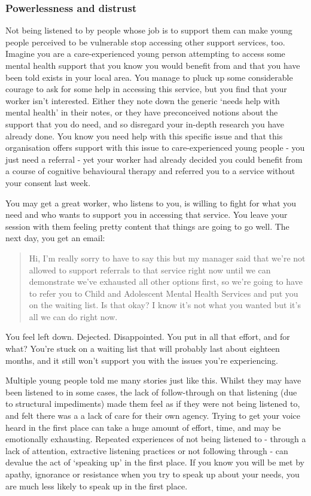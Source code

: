 \subsubsection{Powerlessness and distrust}
Not being listened to by people whose job is to support them can make young people perceived to be vulnerable stop accessing other support services, too. Imagine you are a care-experienced young person attempting to access some mental health support that you know you would benefit from and that you have been told exists in your local area. You manage to pluck up some considerable courage to ask for some help in accessing this service, but you find that your worker isn't interested. Either they note down the generic `needs help with mental health' in their notes, or they have preconceived notions about the support that you do need, and so disregard your in-depth research you have already done. You know you need help with this specific issue and that this organisation offers support with this issue to care-experienced young people - you just need a referral - yet your worker had already decided you could benefit from a course of cognitive behavioural therapy and referred you to a service without your consent last week.

You may get a great worker, who listens to you, is willing to fight for what you need and who wants to support you in accessing that service. You leave your session with them feeling pretty content that things are going to go well. The next day, you get an email:
\begin{quote}
Hi, I'm really sorry to have to say this but my manager said that we’re not allowed to support referrals to that service right now until we can demonstrate we’ve exhausted all other options first, so we’re going to have to refer you to Child and Adolescent Mental Health Services and put you on the waiting list. Is that okay? I know it's not what you wanted but it's all we can do right now.
\end{quote}
You feel left down. Dejected. Disappointed. You put in all that effort, and for what? You’re stuck on a waiting list that will probably last about eighteen months, and it still won’t support you with the issues you’re experiencing. 

Multiple young people told me many stories just like this. Whilst they may have been listened to in some cases, the lack of follow-through on that listening (due to structural impediments) made them feel as if they were not being listened to, and felt there was a a lack of care for their own agency. Trying to get your voice heard in the first place can take a huge amount of effort, time, and may be emotionally exhausting. Repeated experiences of not being listened to - through a lack of attention, extractive listening practices or not following through - can devalue the act of `speaking up' in the first place. If you know you will be met by apathy, ignorance or resistance when you try to speak up about your needs, you are much less likely to speak up in the first place.

